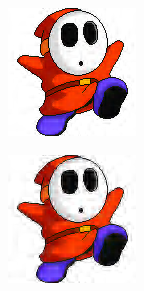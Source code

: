 \documentclass[11pt]{report}
\theoremstyle{plain}
\theoremstyle{remark}
\begin{document}
\begin{figure}
	\centering	
	\begin{subfigure}[b]{0.24\textwidth}
		\centering
		\includegraphics[width=\textwidth]{plaatjes/shyguy_db2_0_1.png}
	\end{subfigure}
	\begin{subfigure}[b]{0.24\textwidth}
		\centering
		\includegraphics[width=\textwidth]{plaatjes/shyguy_db2_0_05.png}

\end{subfigure}
\end{figure}
\end{document}

